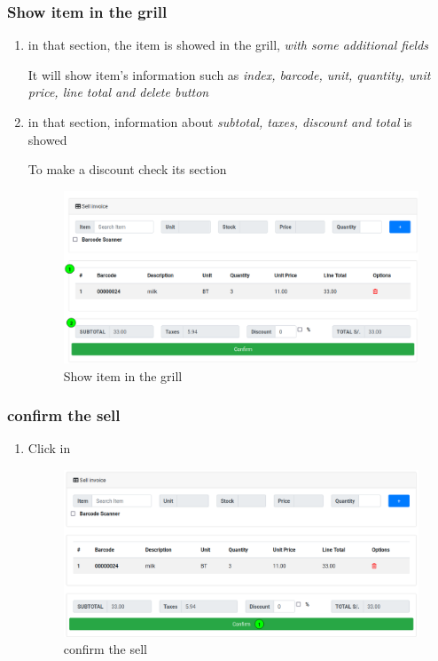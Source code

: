 \documentclass[a4paper,11pt]{refart}
\begin{document}
\subsubsection{Show item in the grill}
\begin{enumerate}
	\item in that section, the item is showed in the grill,  \emph{with some additional fields}
	\medskip
	\begin{leftbar}
		It will show item's information such as \emph{ index, barcode, unit, quantity, unit price, line total and delete button}
	\end{leftbar}
	\item in that section, information about \emph{subtotal, taxes, discount and total} is showed
	\medskip
	\begin{leftbar}
	To make a discount check its section
	\end{leftbar}
	\begin{figure}[H]\centering
		\includegraphics[width=\textwidth]{images/sellinvoice-3}
		\caption{Show item in the grill}\label{fig:sellinvoice-3}
	\end{figure}
\end{enumerate}

\subsubsection{confirm the sell}
\begin{enumerate}
	\item Click in  
	\begin{figure}[H]\centering
		\includegraphics[width=\textwidth]{images/sellinvoice-4}
		\caption{confirm the sell}\label{fig:sellinvoice-4}
	\end{figure}
\end{enumerate}
\end{document}
